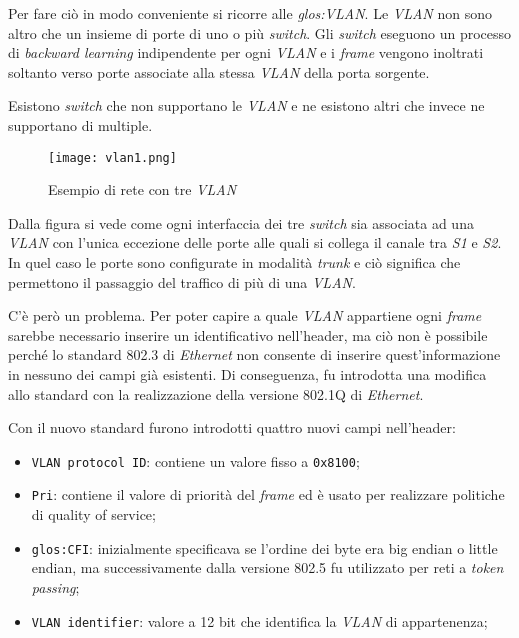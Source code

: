 Per fare ciò in modo conveniente si ricorre alle \emph{\gls{glos:VLAN}}. Le
\emph{VLAN} non sono altro che un insieme di porte di uno o più \emph{switch}.
Gli \emph{switch} eseguono un processo di \emph{backward learning} indipendente
per ogni \emph{VLAN} e i \emph{frame} vengono inoltrati soltanto verso porte
associate alla stessa \emph{VLAN} della porta sorgente.

\begin{note}
    Esistono \emph{switch} che non supportano le \emph{VLAN} e ne esistono
    altri che invece ne supportano di multiple.
\end{note}

\begin{figure}[h!]
    \centering
    \texttt{[image: vlan1.png]}
    \caption{Esempio di rete con tre \emph{VLAN}}
\end{figure}\noindent
Dalla figura si vede come ogni interfaccia dei tre \emph{switch} sia associata
ad una \emph{VLAN} con l'unica eccezione delle porte alle quali si collega il
canale tra \emph{S1} e \emph{S2}. In quel caso le porte sono configurate in
modalità \emph{trunk} e ciò significa che permettono il passaggio del
traffico di più di una \emph{VLAN}.

C'è però un problema. Per poter capire a quale \emph{VLAN} appartiene ogni
\emph{frame} sarebbe necessario inserire un identificativo nell'header, ma
ciò non è possibile perché lo standard 802.3 di \emph{Ethernet} non consente
di inserire quest'informazione in nessuno dei campi già esistenti. Di
conseguenza, fu introdotta una modifica allo standard con la realizzazione
della versione 802.1Q di \emph{Ethernet}.

\bigskip\noindent
Con il nuovo standard furono introdotti quattro nuovi campi nell'header:
\begin{itemize}
    \item \texttt{VLAN protocol ID}: contiene un valore fisso a \texttt{0x8100};
    \item \texttt{Pri}: contiene il valore di priorità del \emph{frame} ed è
    usato per realizzare politiche di quality of service;
    \item \texttt{\gls{glos:CFI}}: inizialmente specificava se l'ordine dei
    byte era big endian o little endian, ma successivamente dalla versione 802.5
    fu utilizzato per reti a \emph{token passing};
    \item \texttt{VLAN identifier}: valore a 12 bit che identifica la \emph{VLAN}
    di appartenenza;
\end{itemize}

